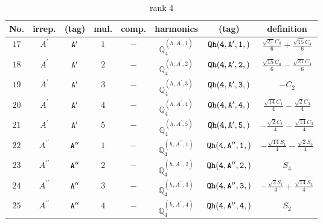 \documentclass[fleqn,8pt]{jsarticle}
\begin{document}
\begin{table}[ht!]
\begin{center}
\caption{rank 4}
\renewcommand{\arraystretch}{1.3}
\begin{tabular}{cccccccc} \hline \hline
No. & irrep. & (tag) & mul. & comp. & harmonics & (tag) & definition \\ \hline
$ 17 $ & $ A^{\prime} $ & $ {\tt A'} $ & $ 1 $ & $ - $ & $ \mathbb{Q}_{4}^{(h,A^{\prime},1)} $ & $ {\tt Qh(4,A',1,)} $ & $ \frac{\sqrt{21} C_{0}}{6} + \frac{\sqrt{15} C_{4}}{6} $ \\
$ 18 $ & $ A^{\prime} $ & $ {\tt A'} $ & $ 2 $ & $ - $ & $ \mathbb{Q}_{4}^{(h,A^{\prime},2)} $ & $ {\tt Qh(4,A',2,)} $ & $ \frac{\sqrt{15} C_{0}}{6} - \frac{\sqrt{21} C_{4}}{6} $ \\
$ 19 $ & $ A^{\prime} $ & $ {\tt A'} $ & $ 3 $ & $ - $ & $ \mathbb{Q}_{4}^{(h,A^{\prime},3)} $ & $ {\tt Qh(4,A',3,)} $ & $ - C_{2} $ \\
$ 20 $ & $ A^{\prime} $ & $ {\tt A'} $ & $ 4 $ & $ - $ & $ \mathbb{Q}_{4}^{(h,A^{\prime},4)} $ & $ {\tt Qh(4,A',4,)} $ & $ \frac{\sqrt{14} C_{1}}{4} - \frac{\sqrt{2} C_{3}}{4} $ \\
$ 21 $ & $ A^{\prime} $ & $ {\tt A'} $ & $ 5 $ & $ - $ & $ \mathbb{Q}_{4}^{(h,A^{\prime},5)} $ & $ {\tt Qh(4,A',5,)} $ & $ - \frac{\sqrt{2} C_{1}}{4} - \frac{\sqrt{14} C_{3}}{4} $ \\
$ 22 $ & $ A^{\prime\prime} $ & $ {\tt A''} $ & $ 1 $ & $ - $ & $ \mathbb{Q}_{4}^{(h,A^{\prime\prime},1)} $ & $ {\tt Qh(4,A'',1,)} $ & $ - \frac{\sqrt{14} S_{1}}{4} - \frac{\sqrt{2} S_{3}}{4} $ \\
$ 23 $ & $ A^{\prime\prime} $ & $ {\tt A''} $ & $ 2 $ & $ - $ & $ \mathbb{Q}_{4}^{(h,A^{\prime\prime},2)} $ & $ {\tt Qh(4,A'',2,)} $ & $ S_{4} $ \\
$ 24 $ & $ A^{\prime\prime} $ & $ {\tt A''} $ & $ 3 $ & $ - $ & $ \mathbb{Q}_{4}^{(h,A^{\prime\prime},3)} $ & $ {\tt Qh(4,A'',3,)} $ & $ - \frac{\sqrt{2} S_{1}}{4} + \frac{\sqrt{14} S_{3}}{4} $ \\
$ 25 $ & $ A^{\prime\prime} $ & $ {\tt A''} $ & $ 4 $ & $ - $ & $ \mathbb{Q}_{4}^{(h,A^{\prime\prime},4)} $ & $ {\tt Qh(4,A'',4,)} $ & $ S_{2} $ \\
 \hline \hline
\end{tabular}
\end{center}
\end{table}
\end{document}
